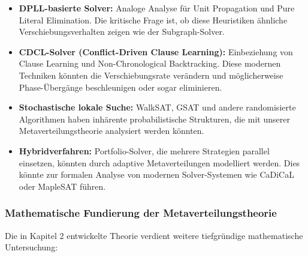 ﻿\documentclass[a4paper,12pt]{article}
\theoremstyle{definition}
\begin{document}
\begin{itemize}
	\item \textbf{DPLL-basierte Solver:} Analoge Analyse für Unit Propagation und Pure Literal Elimination. Die kritische Frage ist, ob diese Heuristiken ähnliche Verschiebungsverhalten zeigen wie der Subgraph-Solver.
	
	\item \textbf{CDCL-Solver (Conflict-Driven Clause Learning):} Einbeziehung von Clause Learning und Non-Chronological Backtracking. Diese modernen Techniken könnten die Verschiebungsrate verändern und möglicherweise Phase-Übergänge beschleunigen oder sogar eliminieren.
	
	\item \textbf{Stochastische lokale Suche:} WalkSAT, GSAT und andere randomisierte Algorithmen haben inhärente probabilistische Strukturen, die mit unserer Metaverteilungstheorie analysiert werden könnten.
	
	\item \textbf{Hybridverfahren:} Portfolio-Solver, die mehrere Strategien parallel einsetzen, könnten durch adaptive Metaverteilungen modelliert werden. Dies könnte zur formalen Analyse von modernen Solver-Systemen wie CaDiCaL oder MapleSAT führen.
\end{itemize}

\subsubsection{Mathematische Fundierung der Metaverteilungstheorie}

Die in Kapitel 2 entwickelte Theorie verdient weitere tiefgründige mathematische Untersuchung:
\end{document}
